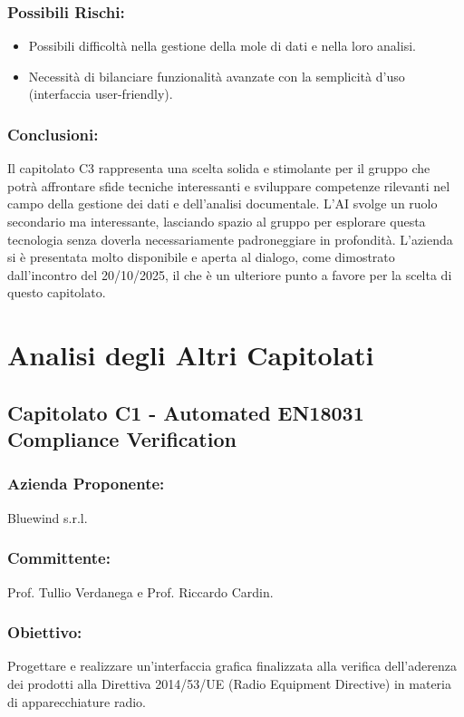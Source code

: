 \documentclass[a4paper,12pt]{article}
\begin{document}
\subsubsection*{Possibili Rischi:}
\begin{itemize}
    \item Possibili difficoltà nella gestione della mole di dati e nella loro analisi.
    \item Necessità di bilanciare funzionalità avanzate con la semplicità d'uso (interfaccia user-friendly).
\end{itemize}

\subsubsection*{Conclusioni:}
Il capitolato C3 rappresenta una scelta solida e stimolante per il gruppo che potrà affrontare sfide tecniche interessanti e sviluppare competenze rilevanti nel campo della gestione dei dati e dell'analisi documentale. 
L'AI svolge un ruolo secondario ma interessante, lasciando spazio al gruppo per esplorare questa tecnologia senza doverla necessariamente padroneggiare in profondità.
L'azienda si è presentata molto disponibile e aperta al dialogo, come dimostrato dall'incontro del 20/10/2025, il che è un ulteriore punto a favore per la scelta di questo capitolato.

\section{Analisi degli Altri Capitolati}

\subsection{ Capitolato C1 - Automated EN18031 Compliance Verification}
\subsubsection*{Azienda Proponente:} Bluewind s.r.l.
\subsubsection*{Committente:} Prof. Tullio Verdanega e Prof. Riccardo Cardin.
\subsubsection*{Obiettivo:} Progettare e realizzare un’interfaccia grafica finalizzata alla verifica dell’aderenza dei prodotti alla Direttiva 2014/53/UE (Radio Equipment Directive) in materia di apparecchiature radio. 
\end{document}
